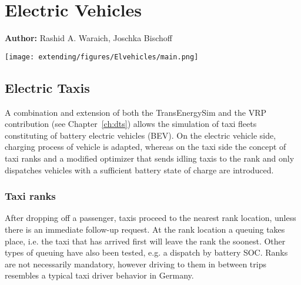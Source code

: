 \chapter{Electric Vehicles }
\label{ch:elvehicles}

\hfill \textbf{Author:} Rashid A. Waraich, Joschka Bischoff

\begin{center} \texttt{[image: extending/figures/Elvehicles/main.png]} \end{center}



\section{Electric Taxis} 
A combination and extension of both the TransEnergySim and the VRP contribution (see Chapter~\ref{ch:dts}) allows the simulation of taxi fleets constituting of battery electric vehicles (BEV).
On the electric vehicle side, charging process of vehicle is adapted, whereas on the taxi side the concept of taxi ranks and a modified optimizer that sends idling taxis to the rank and only dispatches vehicles with a sufficient battery state of charge are introduced. 
\subsection{Taxi ranks}
After dropping off a passenger, taxis proceed to the nearest rank location, unless there is an immediate follow-up request. At the rank location a queuing takes place, i.e. the taxi that has arrived first will leave the rank the soonest. Other types of queuing have also been tested, e.g. a dispatch by battery SOC.
Ranks are not necessarily mandatory, however driving to them in between trips resembles a typical taxi driver behavior in Germany.
